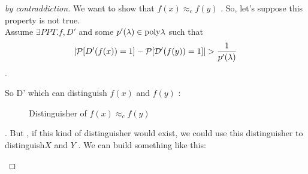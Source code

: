 \begin{proof}
    [by contraddiction]
We want to show that  $ f(x) \approx_{c} f(y) $ . So, let's suppose this property is not true.\\
 Assume $ \exists PPT.f, D' $ and some $ p'(\lambda) \in \mathrm{poly}{\lambda} $ such that
    \begin{equation}
        |\mathcal{P} [ D '(f(x))=1 ] - \mathcal{P} [ \mathcal{D} '(f(y))=1 ]| > \frac{1}{p'(\lambda)}
    \end{equation}.

So D' which can distinguish $f(x)$ and $f(y)$ :


\begin{figure}[h!]
   \centering
   \sdinit{}
   \caption{Distinguisher of $f(x) \approx_{c} f(y)$}
   \label{fig:dis1}
\end{figure}.
But , if this kind of distinguisher would exist, we could use this distinguisher
to distinguish$X$ and $Y$ .
\newpage
We can build something like this:

\begin{figure}[h!]
   \centering
   \sdinit{}
\end{figure}
\end{proof}
